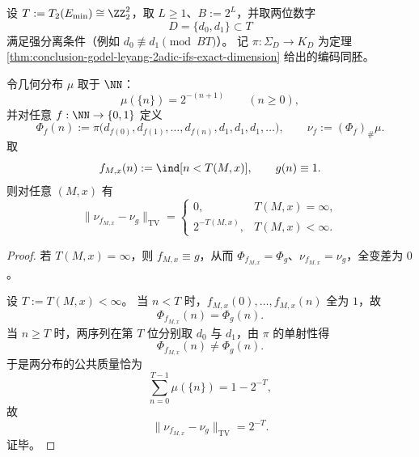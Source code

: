 \begin{theorem}\label{thm:conclusion-halting-tv-spectral-embedding-on-2adic-attractor}
设 \(T:=T_2(E_{\min})\cong\ZZ_2^2\)，取 \(L\ge 1\)、\(B:=2^L\)，并取两位数字
\[
D=\{d_0,d_1\}\subset T
\]
满足强分离条件（例如 \(d_0\not\equiv d_1\pmod{BT}\)）。
记 \(\pi:\Sigma_D\to K_D\) 为定理 \ref{thm:conclusion-godel-leyang-2adic-ifs-exact-dimension} 给出的编码同胚。

令几何分布 \(\mu\) 取于 \(\NN\)：
\[
\mu(\{n\})=2^{-(n+1)}\qquad(n\ge 0),
\]
并对任意 \(f:\NN\to\{0,1\}\) 定义
\[
\Phi_f(n):=\pi\!\bigl(d_{f(0)},d_{f(1)},\dots,d_{f(n)},d_1,d_1,d_1,\dots\bigr),
\qquad
\nu_f:=(\Phi_f)_\#\mu.
\]
取
\[
f_{M,x}(n):=\ind[n<T(M,x)],
\qquad
g(n)\equiv 1.
\]
则对任意 \((M,x)\) 有
\[
\|\nu_{f_{M,x}}-\nu_g\|_{\mathrm{TV}}
=
\begin{cases}
0,&T(M,x)=\infty,\\[2pt]
2^{-T(M,x)},&T(M,x)<\infty.
\end{cases}
\]
\end{theorem}
\begin{proof}
若 \(T(M,x)=\infty\)，则 \(f_{M,x}\equiv g\)，从而 \(\Phi_{f_{M,x}}=\Phi_g\)、\(\nu_{f_{M,x}}=\nu_g\)，全变差为 \(0\)。

设 \(T:=T(M,x)<\infty\)。
当 \(n<T\) 时，\(f_{M,x}(0),\dots,f_{M,x}(n)\) 全为 \(1\)，故
\[
\Phi_{f_{M,x}}(n)=\Phi_g(n).
\]
当 \(n\ge T\) 时，两序列在第 \(T\) 位分别取 \(d_0\) 与 \(d_1\)，由 \(\pi\) 的单射性得
\[
\Phi_{f_{M,x}}(n)\neq \Phi_g(n).
\]
于是两分布的公共质量恰为
\[
\sum_{n=0}^{T-1}\mu(\{n\})=1-2^{-T},
\]
故
\[
\|\nu_{f_{M,x}}-\nu_g\|_{\mathrm{TV}}=2^{-T}.
\]
证毕。
\end{proof}

